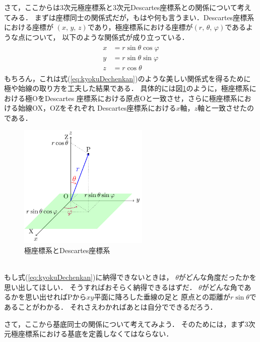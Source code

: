 さて，ここからは3次元極座標系と3次元Descartes座標系との関係について考えてみる．
まずは座標同士の関係式だが，もはや何も言うまい．Descartes座標系における座標が
$(x, \, y, \, z)$であり，極座標系における座標が$(r, \, \theta, \, \varphi)$であるような点について，
以下のような関係式が成り立っている．
\begin{align}
\begin{aligned}
x & = r \sin \theta \cos \varphi \\
y & = r \sin \theta \sin \varphi \\
z & = r \cos \theta
\label{eq:kyokuDechenkan}
\end{aligned}
\end{align}
もちろん，これは式(\ref{eq:kyokuDechenkan})のような美しい関係式を得るために
極や始線の取り方を工夫した結果である． 
具体的には図\ref{fig:kyokuDeckankei}のように，極座標系における極OをDescartes
座標系における原点Oと一致させ，さらに極座標系における始線OX，OZをそれぞれ
Descartes座標系における$x$軸，$z$軸と一致させたのである．
\begin{figure}[h]
 \begin{center}
 \includegraphics[width=6.2cm]{picture/vecter23.pdf}
 \caption{極座標系とDescartes座標系}
\label{fig:kyokuDeckankei}
 \end{center}
\end{figure}
\\
もし式(\ref{eq:kyokuDechenkan})に納得できないときは，
$\theta$がどんな角度だったかを思い出してほしい．
そうすればおそらく納得できるはずだ．
$\theta$がどんな角であるかを思い出せればPから$xy$平面に降ろした垂線の足と
原点との距離が$r \sin \theta$であることがわかる．
それさえわかればあとは自分でできるだろう．

さて，ここから基底同士の関係について考えてみよう．
そのためには，まず3次元極座標系における基底を定義しなくてはならない．

